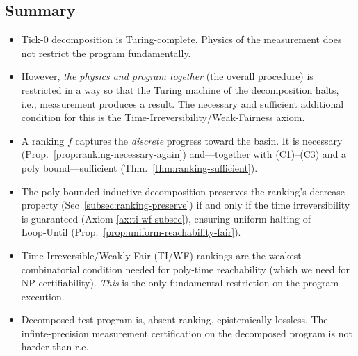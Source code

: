 \documentclass[12pt]{article}
\theoremstyle{definition}
\theoremstyle{plain}
\begin{document}
\subsection{Summary}
\label{subsec:ranking-summary}

\begin{itemize}
  \item Tick-0 decomposition is Turing-complete. Physics of the measurement does not restrict the program fundamentally.
  \item However, \emph{the physics and program together} (the overall procedure) is restricted in a way so that the Turing machine of the decomposition halts, i.e., measurement produces a result. The necessary and sufficient additional condition for this is the Time-Irreversibility/Weak-Fairness axiom.
  \item A ranking $f$ captures the \emph{discrete} progress toward the basin.  It is necessary (Prop.~\ref{prop:ranking-necessary-again}) and—together with (C1)–(C3) and a poly bound—sufficient (Thm.~\ref{thm:ranking-sufficient}).
  \item The poly-bounded inductive decomposition preserves the ranking’s decrease property (Sec~\ref{subsec:ranking-preserve}) if and only if the time irreversibility is guaranteed (Axiom-\ref{ax:ti-wf-subsec}), ensuring uniform halting of Loop‑Until (Prop.~\ref{prop:uniform-reachability-fair}). 
  \item Time-Irreversible/Weakly Fair (TI/WF) rankings are the weakest combinatorial condition needed for poly-time reachability (which we need for NP certifiability). \emph{This} is the only fundamental restriction on the program execution.
  \item Decomposed test program is, absent ranking, epistemically lossless. The infinte-precision measurement certification on the decomposed program is not harder than r.e.
\end{itemize}
\end{document}
